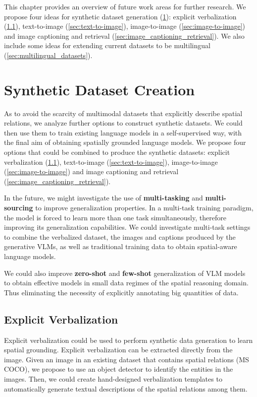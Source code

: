 This chapter provides an overview of future work areas for further research. We propose four ideas for synthetic dataset generation (\cref{sec:synthetic_dataset}): explicit verbalization (\ref{sec:explicit_verbalization}), text-to-image (\ref{sec:text-to-image}), image-to-image (\ref{sec:image-to-image}) and image captioning and retrieval (\ref{sec:image_captioning_retrieval}). We also include some ideas for extending current datasets to be multilingual (\cref{sec:multilingual_datasets}).

\section{Synthetic Dataset Creation} \label{sec:synthetic_dataset}

As to avoid the scarcity of multimodal datasets that explicitly describe spatial relations, we analyze further options to construct synthetic datasets. We could then use them to train existing language models in a self-supervised way, with the final aim of obtaining spatially grounded language models. We propose four options that could be combined to produce the synthetic datasets: explicit verbalization (\ref{sec:explicit_verbalization}), text-to-image (\ref{sec:text-to-image}), image-to-image (\ref{sec:image-to-image}) and image captioning and retrieval (\ref{sec:image_captioning_retrieval}).

In the future, we might investigate the use of \textbf{multi-tasking} and \textbf{multi-sourcing} to improve generalization properties. In a multi-task training paradigm, the model is forced to learn more than one task simultaneously, therefore improving its generalization capabilities. We could investigate multi-task settings to combine the verbalized dataset, the images and captions produced by the generative VLMs, as well as traditional training data to obtain spatial-aware language models.

We could also improve \textbf{zero-shot} and \textbf{few-shot} generalization of VLM models to obtain effective models in small data regimes of the spatial reasoning domain. Thus eliminating the necessity of explicitly annotating big quantities of data.

\subsection{Explicit Verbalization} \label{sec:explicit_verbalization}

Explicit verbalization could be used to perform synthetic data generation to learn spatial grounding. Explicit verbalization can be extracted directly from the image. Given an image in an existing dataset that contains spatial relations (MS COCO), we propose to use an object detector to identify the entities in the images. Then, we could create hand-designed verbalization templates to automatically generate textual descriptions of the spatial relations among them.

